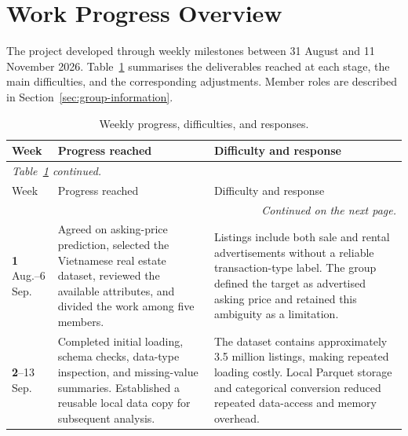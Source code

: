 \section{Work Progress Overview}
\label{sec:work-progress}

The project developed through weekly milestones between 31 August and 11 November 2026. Table~\ref{tab:work-progress} summarises the deliverables reached at each stage, the main difficulties, and the corresponding adjustments. Member roles are described in Section~\ref{sec:group-information}.

\begingroup
\small
\setlength{\emergencystretch}{3em}
\renewcommand{\arraystretch}{1.15}
\begin{longtable}{p{1.7cm}p{6.0cm}p{6.0cm}}
\caption[Weekly progress and difficulties]{Weekly progress, difficulties, and responses.}
\label{tab:work-progress}\\
\toprule
Week & Progress reached & Difficulty and response \\
\midrule
\endfirsthead
\multicolumn{3}{l}{\textit{Table~\ref{tab:work-progress} continued.}}\\
\toprule
Week & Progress reached & Difficulty and response \\
\midrule
\endhead
\midrule
\multicolumn{3}{r}{\textit{Continued on the next page.}}\\
\endfoot
\bottomrule
\endlastfoot

\textbf{1}\newline
31 Aug.--6 Sep. & Agreed on asking-price prediction, selected the Vietnamese real estate dataset, reviewed the available attributes, and divided the work among five members. & Listings include both sale and rental advertisements without a reliable transaction-type label. The group defined the target as advertised asking price and retained this ambiguity as a limitation. \\
\midrule

\textbf{2}\newline
7--13 Sep. & Completed initial loading, schema checks, data-type inspection, and missing-value summaries. Established a reusable local data copy for subsequent analysis. & The dataset contains approximately 3.5 million listings, making repeated loading costly. Local Parquet storage and categorical conversion reduced repeated data-access and memory overhead. \\
\midrule


\end{longtable}

